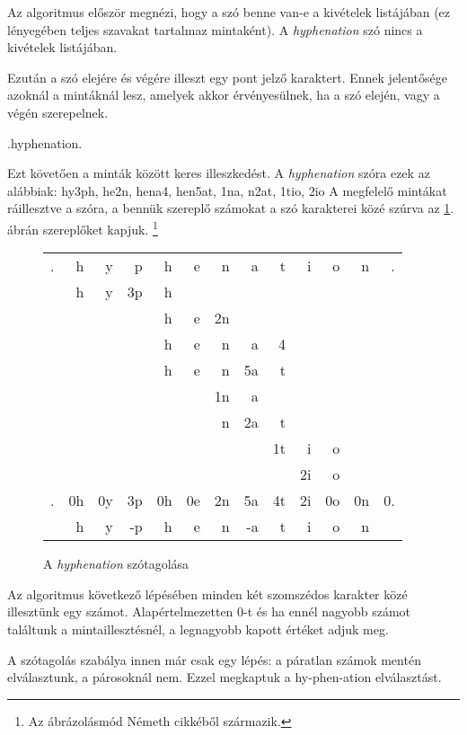 \documentclass[a4paper, magyar]{article}
\begin{document}
Az algoritmus először megnézi, hogy a szó benne van-e a kivételek listájában (ez lényegében teljes szavakat tartalmaz mintaként). A \textit{hyphenation} szó nincs a kivételek listájában.

Ezután a szó elejére és végére illeszt egy pont  jelző karaktert. Ennek jelentősége azoknál a mintáknál lesz, amelyek akkor érvényesülnek, ha a szó elején, vagy a végén szerepelnek.
{\selectfont
	\begin{center}
	.hyphenation.
	\end{center}
}
Ezt követően a minták között keres illeszkedést. A \textit{hyphenation} szóra ezek az alábbiak: 
{\selectfont hy3ph, he2n, hena4, hen5at, 1na, n2at, 1tio,  2io} \cite[37.\ oldal]{liang1983word}
A megfelelő mintákat ráillesztve a szóra, a bennük szereplő számokat a szó karakterei közé szúrva az \ref{liang-hyp}. ábrán szereplőket kapjuk.%
\footnote{Az ábrázolásmód N{\'e}meth cikkéből származik\cite{nemeth2006automatic}.}
\begin{figure}[h]\centering
	{\selectfont
		\setlength{\tabcolsep}{0pt}
		\begin{tabular}{rrrrrrrrrrrrr}
			.& h& y& p& h& e& n& a & t& i& o& n& .\\
			 & h& y&3p& h\\
			 &  &  &  & h& e&2n\\
			 &  &  &  & h& e& n& a&4\phantom{t}\\
			 &  &  &  & h& e& n&5a&t\\
			 &  &  &  &  &  &1n& a\\
			 &  &  &  &  &  & n&2a& t\\
			 &  &  &  &  &  &  &  &1t& i& o\\
			 &  &  &  &  &  &  &  &  &2i& o\\
			 \hline
			 .&0h&0y&3p&0h&0e&2n&5a&4t&2i&0o&0n&0.\\
			  & h& y&-p& h& e& n&-a& t& i& o& n
		\end{tabular}
	}
\caption{A \textit{hyphenation} szótagolása}\par\medskip\centering
\label{liang-hyp}
\end{figure}


Az algoritmus következő lépésében minden két szomszédos karakter közé illesztünk egy számot. Alapértelmezetten $0$-t és ha ennél nagyobb számot találtunk a mintaillesztésnél, a legnagyobb kapott értéket adjuk meg.

A szótagolás szabálya innen már csak egy lépés: a páratlan számok mentén elválasztunk, a párosoknál nem. Ezzel megkaptuk a
{\selectfont
	hy-phen-ation%
}
elválasztást.
\end{document}
